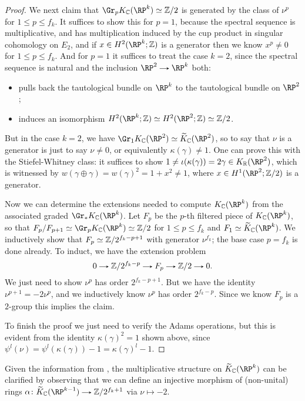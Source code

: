 \begin{proof}
  We next claim that $\Gr_pK_\C(\RP^k) \simeq \Z/2$ is generated by
  the class of $\nu^p$ for $1 \le p \le f_k$. It suffices to show this
  for $p=1$, because the spectral sequence is multiplicative, and has
  multiplication induced by the cup product in singular cohomology on
  $E_2$, and if $x \in H^2(\RP^k;\Z)$ is a generator then we know
  $x^p \ne 0$ for $1 \le p \le f_k$. And for $p=1$ it suffices to
  treat the case $k=2$, since the spectral sequence is natural and the
  inclusion $\RP^2 \to \RP^k$ both:
  \begin{itemize}
  \item pulls back the tautological bundle on $\RP^k$ to the
    tautological bundle on $\RP^2$;
  \item induces an isomorphism $H^2(\RP^k;\Z) \simeq H^2(\RP^2;\Z)
    \simeq \Z/2$.
  \end{itemize}
  But in the case $k=2$, we have $ \Gr_1K_\C(\RP^2) \simeq
  \til K_\C(\RP^2)$, so to say that $\nu$ is a generator is just to say
  $\nu \ne 0$, or equivalently $\kappa(\gamma) \ne 1$. One can prove
  this with the Stiefel-Whitney class: it suffices to show $1 \ne
  \iota(\kappa(\gamma)) = 2\gamma \in K_\R(\RP^2)$, which is
  witnessed by $w(\gamma\oplus\gamma) = w(\gamma)^2 = 1+x^2 \ne 1$,
  where $x \in H^1(\RP^2;\Z/2)$ is a generator.

  Now we can determine the extensions needed to compute $K_\C(\RP^k)$
  from the associated graded $\Gr_*K_\C(\RP^k)$. Let $F_p$ be the
  $p$-th filtered piece of $K_\C(\RP^k)$, so that $F_p/F_{p+1} \simeq
  \Gr_pK_\C(\RP^k) \simeq \Z/2$ for $1 \le p \le f_k$ and $F_1 \simeq
  \til K_\C(\RP^k)$. We inductively show that $F_p \simeq
  \mathbb{Z}/2^{f_k-p+1}$ with generator $\nu^{f_k}$; the base case $p=f_k$ is
  done already. To induct, we have the extension problem
  \[
  0 \to \Z/2^{f_k-p} \to F_p \to \Z/2 \to 0.
  \]
  We just need to show $\nu^p$ has order $2^{f_k-p+1}$. But we have
  the identity $\nu^{p+1} = -2\nu^p$, and we inductively know $\nu^p$
  has order $2^{f_k-p}$. Since we know $F_p$ is a $2$-group this
  implies the claim.

  To finish the proof we just need to verify the Adams operations, but
  this is evident from the identity $\kappa(\gamma)^2 = 1$ shown
  above, since $\psi^l(\nu) = \psi^l(\kappa(\gamma)) - 1 =
  \kappa(\gamma)^l - 1$.
\end{proof}

\begin{remark}
  \label{RP-ringhom}
  Given the information from , the multiplicative
  structure on $\til K_\C(\RP^k)$ can be clarified by observing that we
  can define an injective morphism of (non-unital) rings $\alpha \c
  \til K_\C(\RP^{k-1}) \to \Z/2^{f_k+1}$ via $\nu \mapsto -2$.
\end{remark}

